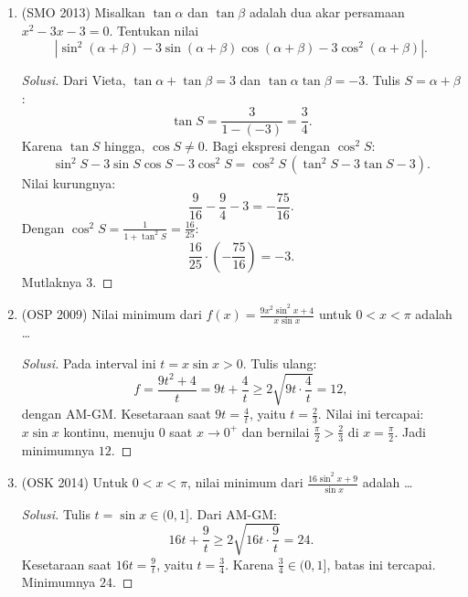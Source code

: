 \documentclass[12pt]{scrartcl}
\begin{document}
\begin{enumerate}
	\item (SMO 2013)
	Misalkan $\tan\alpha$ dan $\tan\beta$ adalah dua akar persamaan
	$x^2-3x-3 = 0$. Tentukan nilai
	\[ \left|\sin^2(\alpha+\beta) - 3\sin(\alpha+\beta)\cos(\alpha+\beta)
	- 3\cos^2(\alpha+\beta)\right|. \]
	\begin{proof}[Solusi]
	Dari Vieta, $\tan\alpha + \tan\beta = 3$ dan $\tan\alpha\tan\beta = -3$.
	Tulis $S = \alpha+\beta$:
	\[ \tan S = \frac{3}{1-(-3)} = \frac34. \]
	Karena $\tan S$ hingga, $\cos S \ne 0$. Bagi ekspresi dengan $\cos^2 S$:
	\[ \sin^2 S - 3\sin S\cos S - 3\cos^2 S
	= \cos^2 S\,(\tan^2 S - 3\tan S - 3). \]
	Nilai kurungnya:
	\[ \frac{9}{16} - \frac{9}{4} - 3 = -\frac{75}{16}. \]
	Dengan $\cos^2 S = \frac{1}{1+\tan^2 S} = \frac{16}{25}$:
	\[ \frac{16}{25} \cdot \left(-\frac{75}{16}\right) = -3. \]
	Mutlaknya $3$.
	\end{proof}

	\item (OSP 2009)
	Nilai minimum dari $f(x) = \frac{9x^{2}\sin^{2}x + 4}{x\sin x}$
	untuk $0 < x < \pi$ adalah \dots
	\begin{proof}[Solusi]
	Pada interval ini $t = x\sin x > 0$. Tulis ulang:
	\[ f = \frac{9t^2+4}{t} = 9t + \frac{4}{t} \ge 2\sqrt{9t \cdot \frac{4}{t}} = 12, \]
	dengan AM-GM. Kesetaraan saat $9t = \frac4t$, yaitu $t = \frac23$.
	Nilai ini tercapai: $x\sin x$ kontinu, menuju $0$ saat $x \to 0^{+}$ dan
	bernilai $\frac{\pi}{2} > \frac23$ di $x = \frac{\pi}{2}$.
	Jadi minimumnya $12$.
	\end{proof}

	\item (OSK 2014)
	Untuk $0 < x < \pi$, nilai minimum dari
	$\frac{16\sin^2 x + 9}{\sin x}$ adalah \dots
	\begin{proof}[Solusi]
	Tulis $t = \sin x \in (0, 1]$. Dari AM-GM:
	\[ 16t + \frac{9}{t} \ge 2\sqrt{16t \cdot \frac{9}{t}} = 24. \]
	Kesetaraan saat $16t = \frac9t$, yaitu $t = \frac34$.
	Karena $\frac34 \in (0, 1]$, batas ini tercapai. Minimumnya $24$.
	\end{proof}


\end{enumerate}
\end{document}
